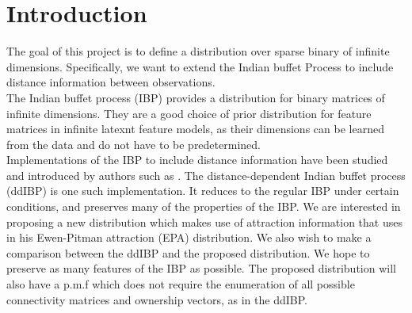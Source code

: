 \chapter{Introduction} %

The goal of this project is to define a distribution over sparse binary of
infinite dimensions. Specifically, we want to extend the Indian buffet Process
to include distance information between observations. \\

\noindent
The Indian buffet process (IBP) provides a distribution for binary matrices of
infinite dimensions. They are a good choice of prior distribution for feature
matrices in infinite latexnt feature models, as their dimensions can be learned
from the data and do not have to be predetermined.\\

\noindent
Implementations of the IBP to include distance information have been studied and
introduced by authors such as \cite{ddibp}. The distance-dependent Indian buffet
process (ddIBP) is one such implementation. It reduces to the regular IBP under
certain conditions, and preserves many of the properties of the IBP. We are 
interested in proposing a new distribution which makes use of attraction information
that \cite{epa} uses in his Ewen-Pitman attraction (EPA) distribution. We
also wish to make a comparison between the ddIBP and the proposed distribution.
We hope to preserve as many features of the IBP as possible. The proposed 
distribution will also have a p.m.f which does not require the enumeration of all
possible connectivity matrices and ownership vectors, as in the ddIBP.

